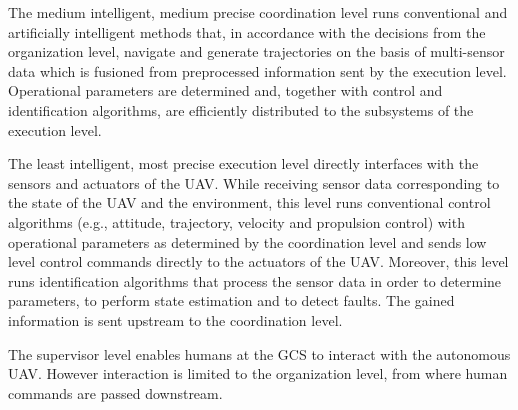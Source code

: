 The medium intelligent, medium precise coordination level runs conventional and artificially intelligent methods that, 
in accordance with the decisions from the organization level,
navigate and generate trajectories on the basis of multi-sensor data which is fusioned from preprocessed information sent by the execution level. 
Operational parameters are determined and, together with control and identification algorithms, are efficiently distributed to the subsystems of the execution level.

The least intelligent, most precise execution level directly interfaces with the sensors and actuators of the UAV. 
While receiving sensor data corresponding to the state of the UAV and the environment, 
this level runs conventional control algorithms (e.g., attitude, trajectory, velocity and propulsion control) with operational parameters as determined by the coordination level 
and sends low level control commands directly to the actuators of the UAV.
Moreover, this level runs identification algorithms that process the sensor data in order to determine parameters, to perform state estimation and to detect faults.
The gained information is sent upstream to the coordination level.

The supervisor level enables humans at the GCS to interact with the autonomous UAV.
However interaction is limited to the organization level, from where human commands are passed downstream.

